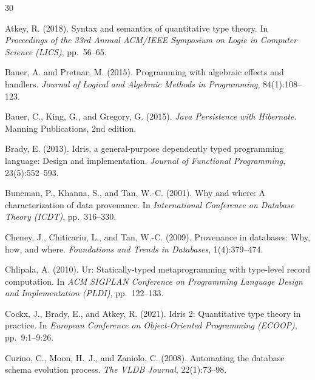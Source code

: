 \documentclass[11pt,a4paper]{article}
\begin{document}
\begin{thebibliography}{30}

Atkey, R. (2018).
\newblock Syntax and semantics of quantitative type theory.
\newblock In \emph{Proceedings of the 33rd Annual ACM/IEEE Symposium on Logic
  in Computer Science (LICS)}, pp.~56--65.

Bauer, A. and Pretnar, M. (2015).
\newblock Programming with algebraic effects and handlers.
\newblock \emph{Journal of Logical and Algebraic Methods in Programming},
  84(1):108--123.

Bauer, C., King, G., and Gregory, G. (2015).
\newblock \emph{Java Persistence with Hibernate}.
\newblock Manning Publications, 2nd edition.

Brady, E. (2013).
\newblock Idris, a general-purpose dependently typed programming language:
  Design and implementation.
\newblock \emph{Journal of Functional Programming}, 23(5):552--593.

Buneman, P., Khanna, S., and Tan, W.-C. (2001).
\newblock Why and where: A characterization of data provenance.
\newblock In \emph{International Conference on Database Theory (ICDT)},
  pp.~316--330.

Cheney, J., Chiticariu, L., and Tan, W.-C. (2009).
\newblock Provenance in databases: Why, how, and where.
\newblock \emph{Foundations and Trends in Databases}, 1(4):379--474.

Chlipala, A. (2010).
\newblock Ur: Statically-typed metaprogramming with type-level record
  computation.
\newblock In \emph{ACM SIGPLAN Conference on Programming Language Design and
  Implementation (PLDI)}, pp.~122--133.

Cockx, J., Brady, E., and Atkey, R. (2021).
\newblock Idris 2: Quantitative type theory in practice.
\newblock In \emph{European Conference on Object-Oriented Programming
  (ECOOP)}, pp.~9:1--9:26.

Curino, C., Moon, H.~J., and Zaniolo, C. (2008).
\newblock Automating the database schema evolution process.
\newblock \emph{The VLDB Journal}, 22(1):73--98.


\end{thebibliography}
\end{document}
